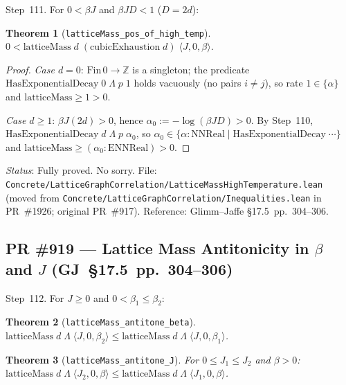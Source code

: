 \documentclass[a4paper,11pt]{article}
\newtheorem{theorem}{Theorem}
\begin{document}
Step~111.  For $0 < \beta J$ and $\beta J D < 1$ ($D = 2d$):

\begin{theorem}[\texttt{latticeMass\_pos\_of\_high\_temp}]
$0 < \mathrm{latticeMass}\;d\;(\mathrm{cubicExhaustion}\;d)\;\langle J,0,\beta\rangle$.
\end{theorem}

\begin{proof}
\textit{Case $d = 0$}: $\mathrm{Fin}\,0\to\mathbb{Z}$ is a singleton; the predicate
$\mathrm{HasExponentialDecay}\;0\;\Lambda\;p\;1$ holds vacuously (no pairs $i \ne j$),
so rate $1 \in \{\alpha\}$ and $\mathrm{latticeMass} \ge 1 > 0$.

\textit{Case $d \ge 1$}: $\beta J (2d) > 0$, hence
$\alpha_0 := -\log(\beta J D) > 0$.
By Step~110, $\mathrm{HasExponentialDecay}\;d\;\Lambda\;p\;\alpha_0$,
so $\alpha_0 \in \{\alpha : \mathrm{NNReal} \mid \mathrm{HasExponentialDecay}\;\cdots\}$
and $\mathrm{latticeMass} \ge (\alpha_0 : \mathrm{ENNReal}) > 0$.
\end{proof}

\noindent\textit{Status}: Fully proved. No sorry.
File: \texttt{Concrete/LatticeGraphCorrelation/LatticeMassHighTemperature.lean} (moved from \texttt{Concrete/LatticeGraphCorrelation/Inequalities.lean} in PR~\#1926; original PR~\#917).
Reference: Glimm--Jaffe \S17.5~pp.~304--306.

\subsection*{PR \#919 --- Lattice Mass Antitonicity in $\beta$ and $J$
(GJ~\S17.5~pp.~304--306)}

Step~112.  For $J \ge 0$ and $0 < \beta_1 \le \beta_2$:

\begin{theorem}[\texttt{latticeMass\_antitone\_beta}]
$\mathrm{latticeMass}\;d\;\Lambda\;\langle J,0,\beta_2\rangle \le
\mathrm{latticeMass}\;d\;\Lambda\;\langle J,0,\beta_1\rangle$.
\end{theorem}

\begin{theorem}[\texttt{latticeMass\_antitone\_J}]
For $0 \le J_1 \le J_2$ and $\beta > 0$:
$\mathrm{latticeMass}\;d\;\Lambda\;\langle J_2,0,\beta\rangle \le
\mathrm{latticeMass}\;d\;\Lambda\;\langle J_1,0,\beta\rangle$.
\end{theorem}
\end{document}

